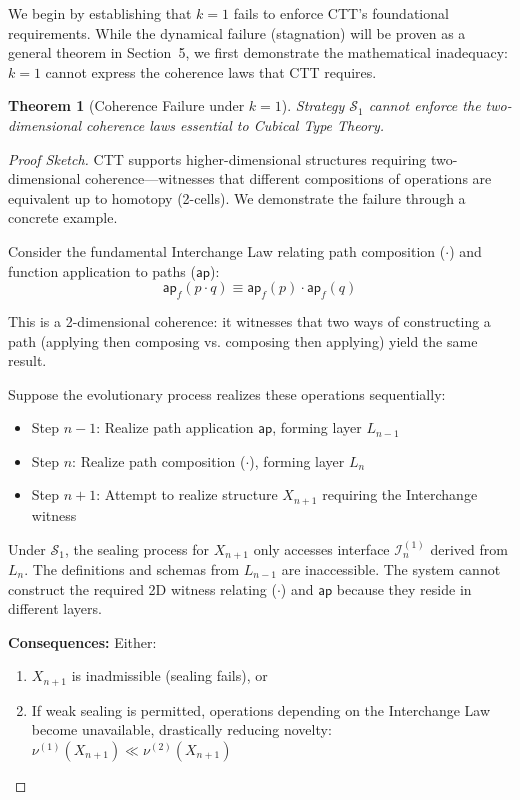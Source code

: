 \documentclass[11pt]{article}
\newtheorem{theorem}{Theorem}[section]
\theoremstyle{definition}
\theoremstyle{remark}
\begin{document}
We begin by establishing that $k = 1$ fails to enforce CTT's foundational requirements. While the
dynamical failure (stagnation) will be proven as a general theorem in Section~5, we first demonstrate
the mathematical inadequacy: $k = 1$ cannot express the coherence laws that CTT requires.

\begin{theorem}[Coherence Failure under $k = 1$]
\label{thm:k1-nogo}
Strategy $\mathcal{S}_1$ cannot enforce the two-dimensional coherence laws essential to Cubical Type
Theory.
\end{theorem}

\begin{proof}[Proof Sketch]
CTT supports higher-dimensional structures requiring two-dimensional coherence---witnesses that
different compositions of operations are equivalent up to homotopy (2-cells). We demonstrate the
failure through a concrete example.

Consider the fundamental Interchange Law relating path composition ($\cdot$) and function application
to paths ($\mathsf{ap}$):
\[
\mathsf{ap}_f(p \cdot q) \equiv \mathsf{ap}_f(p) \cdot \mathsf{ap}_f(q)
\]

This is a 2-dimensional coherence: it witnesses that two ways of constructing a path (applying then
composing vs. composing then applying) yield the same result.

Suppose the evolutionary process realizes these operations sequentially:
\begin{itemize}
\item Step $n - 1$: Realize path application $\mathsf{ap}$, forming layer $L_{n-1}$
\item Step $n$: Realize path composition ($\cdot$), forming layer $L_n$
\item Step $n + 1$: Attempt to realize structure $X_{n+1}$ requiring the Interchange witness
\end{itemize}

Under $\mathcal{S}_1$, the sealing process for $X_{n+1}$ only accesses interface $\mathcal{I}_n^{(1)}$ derived from $L_n$.
The definitions and schemas from $L_{n-1}$ are inaccessible. The system cannot construct the required
2D witness relating ($\cdot$) and $\mathsf{ap}$ because they reside in different layers.

\textbf{Consequences:} Either:
\begin{enumerate}
\item $X_{n+1}$ is inadmissible (sealing fails), or
\item If weak sealing is permitted, operations depending on the Interchange Law become unavailable,
drastically reducing novelty: $\nu^{(1)}(X_{n+1}) \ll \nu^{(2)}(X_{n+1})$
\end{enumerate}
\end{proof}
\end{document}
